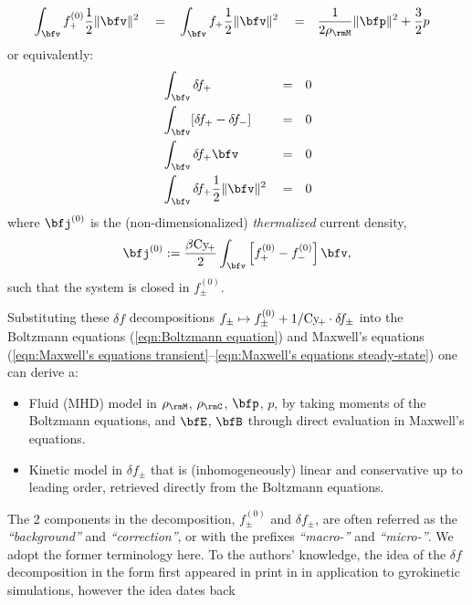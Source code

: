 \begin{definition}
\begin{align}
            &\int_{\bfv}f_{+}^{(0)}\frac{1}{2}\|\bfv\|^{2}      &  &=  &  &\int_{\bfv}f_{+}\frac{1}{2}\|\bfv\|^{2}  &  &=  &  \frac{1}{2\rho_{\rmM}}\|\bfp\|^{2} + \frac{3}{2}&p
        \end{align}
        or equivalently:
        \begin{align}
            &\int_{\bfv}\delta\!f_{+}                         &  &=  &  0  \label{eqn:correction mass moment}  \\
            &\int_{\bfv}[\delta\!f_{+} - \delta\!f_{-}]       &  &=  &  0  \\
            &\int_{\bfv}\delta\!f_{+}\bfv                     &  &=  &  0  \\
            &\int_{\bfv}\delta\!f_{+}\frac{1}{2}\|\bfv\|^{2}  &  &=  &  0  \label{eqn:correction energy moment}
        \end{align}
        where $\bfj^{(0)}$ is the (non-dimensionalized) \emph{thermalized} current density,
        \begin{equation}\label{eqn:thermalized current density}
            \bfj^{(0)}  :=  \frac{\beta\rmCy\!_{+}}{2}\int_{\bfv}\left[f_{+}^{(0)} - f_{-}^{(0)}\right]\bfv,
        \end{equation}
        such that the system is closed in $f_{\pm}^{(0)}$.

        Substituting these $\delta\!f$ decompositions $f_{\pm}  \mapsto  f_{\pm}^{(0)} + 1/\mathrm{Cy}\!_{+}\cdot\delta\!f_{\pm}$ into the Boltzmann equations (\ref{eqn:Boltzmann equation}) and Maxwell's equations (\ref{eqn:Maxwell's equations transient}--\ref{eqn:Maxwell's equations steady-state}) one can derive a:
        \begin{itemize}
            \item  Fluid (MHD) model in $\rho_{\rmM}$, $\rho_{\rmC}$, $\bfp$, $p$, by taking moments of the Boltzmann equations, and $\bfE$, $\bfB$ through direct evaluation in Maxwell's equations.
            \item  Kinetic model in $\delta\!f_{\pm}$ that is (inhomogeneously) linear and conservative up to leading order, retrieved directly from the Boltzmann equations.
        \end{itemize}
    \end{definition}
    
    The 2 components in the decomposition, $f_{\pm}^{(0)}$ and $\delta\!f_{\pm}$, are often referred as the \emph{``background''} and \emph{``correction''}, or with the prefixes \emph{``macro-''} and \emph{``micro-''}. We adopt the former terminology here. To the authors' knowledge, the idea of the $\delta\!f$ decomposition in the form first appeared in print in \cite{Parker_Lee_1993, Dimits_Lee_1993} in application to gyrokinetic simulations, however the idea dates back

